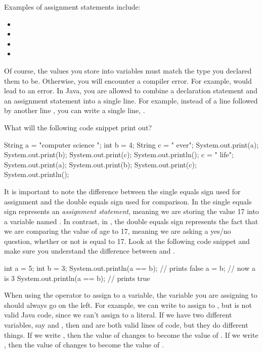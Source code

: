\noindent Examples of assignment statements include:
\begin{itemize}
 \item {}
 \item {}
 \item {}
 \item {}
\end{itemize}
	Of course, the values you store into variables must match the type you declared them to be. Otherwise, you will encounter a compiler error. For example,  would lead to an error.	
In Java, you are allowed to combine a declaration statement and an assignment statement into a single line. For example, instead of a line  followed by another line , you can write a single line, .	
\begin{example}	
  What will the following code snippet print out?	
  \begin{code}	
    String a = "computer  science ";	
    int b = 4;	
    String c = " ever";	
    System.out.print(a);	
    System.out.print(b);	
    System.out.print(c);	
    System.out.println();	
    c = " life";	
    System.out.print(a);	
    System.out.print(b);	
    System.out.print(c);	
    System.out.println();	
  \end{code}	
\end{example}	
It is important to note the difference between the single equals sign used for assignment and the double equals sign used for comparison. In  the single equals sign represents an \emph{assignment statement}, meaning we are storing the value 17 into a variable named . In contrast, in , the double equals sign represents the fact that we are comparing the value of age to 17, meaning we are asking a yes/no question, whether or not  is equal to 17. Look at the following code snippet and make sure you understand the difference between \ic{=} and \ic{==}.	
\begin{code}	
  int a = 5;	
  int b = 3;	
  System.out.println(a == b);   // prints false	
  a = b;                        // now a is 3	
  System.out.println(a == b);   // prints true	
\end{code}	
When using the \ic{=} operator to assign to a variable, the variable you are assigning to should always go on the left. For example, we can write  to assign  to , but  is not valid Java code, since we can't assign to a literal. If we have two different variables, say  and , then  and  are both valid lines of code, but they do different things. If we write , then the value of  changes to become the value of . If we write , then the value of  changes to become the value of .	
